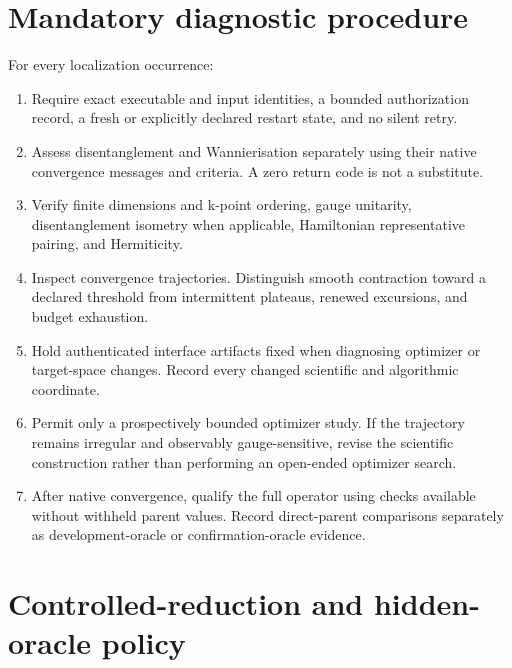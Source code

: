 \documentclass[11pt]{article}
\begin{document}
\section{Mandatory diagnostic procedure}

For every localization occurrence:

\begin{enumerate}
  \item Require exact executable and input identities, a bounded authorization record,
    a fresh or explicitly declared restart state, and no silent retry.
  \item Assess disentanglement and Wannierisation separately using their native
    convergence messages and criteria.  A zero return code is not a substitute.
  \item Verify finite dimensions and k-point ordering, gauge unitarity,
    disentanglement isometry when applicable, Hamiltonian representative pairing, and
    Hermiticity.
  \item Inspect convergence trajectories.  Distinguish smooth contraction toward a
    declared threshold from intermittent plateaus, renewed excursions, and budget
    exhaustion.
  \item Hold authenticated interface artifacts fixed when diagnosing optimizer or
    target-space changes.  Record every changed scientific and algorithmic coordinate.
  \item Permit only a prospectively bounded optimizer study.  If the trajectory remains
    irregular and observably gauge-sensitive, revise the scientific construction rather
    than performing an open-ended optimizer search.
  \item After native convergence, qualify the full operator using checks available
    without withheld parent values.  Record direct-parent comparisons separately as
    development-oracle or confirmation-oracle evidence.
\end{enumerate}

\section{Controlled-reduction and hidden-oracle policy}
\end{document}
